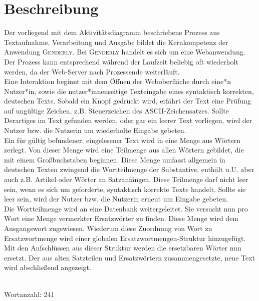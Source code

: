 \documentclass[paper=a4, parskip=half]{scrreprt}
\begin{document}
\chapter{Beschreibung}
Der vorliegend mit dem Aktivitätsdiagramm beschriebene Prozess aus Textaufnahme, Verarbeitung und Ausgabe bildet die Kernkompetenz der Anwendung \textsc{Genderly}. Bei \textsc{Genderly} handelt es sich um eine Webanwendung. Der Prozess kann entsprechend während der Laufzeit beliebig oft wiederholt werden, da der Web-Server nach Prozessende weiterläuft.\\
Eine Interaktion beginnt mit dem Öffnen der Weboberfläche durch eine*n Nutzer*in, sowie die nutzer*innenseitige Texteingabe eines syntaktisch korrekten, deutschen Texts. Sobald ein Knopf gedrückt wird, erfährt der Text eine Prüfung auf ungültige Zeichen, z.B. Steuerzeichen des ASCII-Zeichensatzes. Sollte Derartiges im Text gefunden werden, oder gar ein leerer Text vorliegen, wird der Nutzer bzw. die Nutzerin um wiederholte Eingabe gebeten.\\
Ein für gültig befundener, eingelesener Text wird in eine Menge aus Wörtern zerlegt. Von dieser Menge wird eine Teilmenge aus allen Wörtern gebildet, die mit einem Großbuchstaben beginnen. Diese Menge umfasst allgemein in deutschen Texten zwingend die Wortteilmenge der Substantive, enthält u.U. aber auch z.B. Artikel oder Wörter an Satzanfängen. Diese Teilmenge darf nicht leer sein, wenn es sich um geforderte, syntaktisch korrekte Texte handelt. Sollte sie leer sein, wird der Nutzer bzw. die Nutzerin erneut um Eingabe gebeten.\\
Die Wortteilmenge wird an eine Datenbank weitergeleitet. Sie versucht nun pro Wort eine Menge vermerkter Ersatzwörter zu finden. Diese Menge wird dem Ausgangswort zugewiesen. Wiederum diese Zuordnung von Wort zu Ersatzwortmenge wird einer globalen Ersatzwortmengen-Struktur hinzugefügt. Mit den Aufschlüssen aus dieser Struktur werden die ersetzbaren Wörter nun ersetzt. Der aus alten Satzteilen und Ersatzwörtern zusammengesetzte, neue Text wird abschließend angezeigt.
\\
\\
\begin{tiny}
Wortanzahl: 241
\end{tiny}



%
%


%
\end{document}
